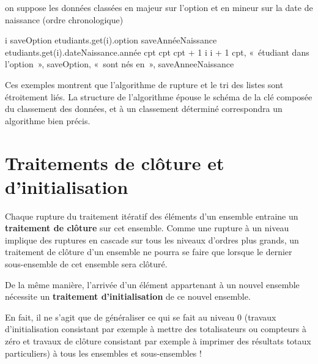 	\begin{LDA}
		\label{algo:rupt2}
			\LComment on suppose les données classées en majeur sur l’option
			\LComment et en mineur sur la date de naissance (ordre chronologique)
	
			\Let i 
				\Let saveOption \Gets etudiants.get(i).option
					\Let saveAnnéeNaissance \Gets etudiants.get(i).dateNaissance.année
					\Let cpt 
						\Let cpt \Gets cpt + 1
						\Let i \Gets i + 1		
					\EndWhile
					\Write cpt, «~étudiant dans l’option~», saveOption, 
					«~sont nés en~», saveAnneeNaissance
				\EndWhile
			\EndWhile
		\EndAlgo
	\end{LDA}

	Ces exemples montrent que l’algorithme de rupture 
	et le tri des listes sont étroitement liés. 
	La structure de l’algorithme épouse le schéma de la clé composée du classement des données,
	et à un classement déterminé correspondra un algorithme bien précis.

\section{Traitements de clôture et d’initialisation}

	Chaque rupture du traitement itératif des éléments d’un ensemble
	entraine un \textbf{traitement de clôture} sur cet ensemble. Comme une
	rupture à un niveau implique des ruptures en cascade sur tous les
	niveaux d’ordres plus grands, un traitement de clôture d’un ensemble ne
	pourra se faire que lorsque le dernier sous-ensemble de cet ensemble
	sera clôturé.
	
	De la même manière, l’arrivée d’un élément appartenant à un nouvel
	ensemble nécessite un \textbf{traitement d’initialisation} de ce nouvel
	ensemble.
	
	En fait, il ne s’agit que de généraliser ce qui se fait au niveau 0 
	(travaux d’initialisation consistant par exemple à mettre des totalisateurs 
	ou compteurs à zéro et travaux de clôture consistant par exemple 
	à imprimer des résultats totaux particuliers) 
	à tous les ensembles et sous-ensembles !
